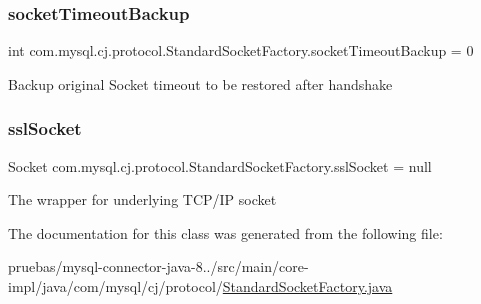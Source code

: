 \subsubsection{\texorpdfstring{socket\+Timeout\+Backup}{socketTimeoutBackup}}
{\footnotesize\ttfamily int com.\+mysql.\+cj.\+protocol.\+Standard\+Socket\+Factory.\+socket\+Timeout\+Backup = 0\hspace{0.3cm}{\ttfamily [protected]}}

Backup original Socket timeout to be restored after handshake \mbox{\label{classcom_1_1mysql_1_1cj_1_1protocol_1_1_standard_socket_factory_aece3a18276dc380df45049ac5d58f731}} 
\subsubsection{\texorpdfstring{ssl\+Socket}{sslSocket}}
{\footnotesize\ttfamily Socket com.\+mysql.\+cj.\+protocol.\+Standard\+Socket\+Factory.\+ssl\+Socket = null\hspace{0.3cm}{\ttfamily [protected]}}

The wrapper for underlying T\+C\+P/\+IP socket 

The documentation for this class was generated from the following file\+:\begin{DoxyCompactItemize}
\item 
pruebas/mysql-\/connector-\/java-\/8../src/main/core-\/impl/java/com/mysql/cj/protocol/\mbox{\hyperlink{_standard_socket_factory_8java}{Standard\+Socket\+Factory.\+java}}\end{DoxyCompactItemize}
